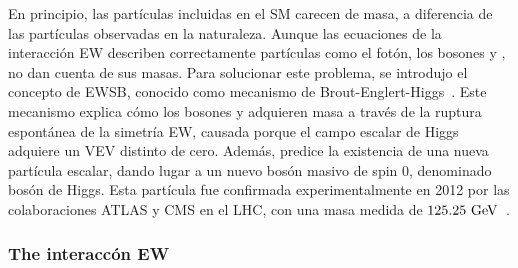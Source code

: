 En principio, las partículas incluidas en el \ac{SM} carecen de masa, a diferencia de las partículas observadas en la naturaleza. Aunque las ecuaciones de la interacci\'on \ac{EW} describen correctamente partículas como el fotón, los bosones \Wboson y \Zboson, no dan cuenta de sus masas. Para solucionar este problema, se introdujo el concepto de \ac{EWSB}, conocido como mecanismo de Brout-Englert-Higgs~\cite{Higgs-1964_1,Higgs-1964_2,Higgs-1966,Englert_Brout-1964}. Este mecanismo explica cómo los bosones \Wboson y \Zboson adquieren masa a través de la ruptura espontánea de la simetría \ac{EW}, causada porque el campo escalar de Higgs adquiere un \ac{VEV} distinto de cero. Además, predice la existencia de una nueva partícula escalar, dando lugar a un nuevo bosón masivo de spin 0, denominado bosón de Higgs. Esta partícula fue confirmada experimentalmente en 2012 por las colaboraciones \ac{ATLAS} y \ac{CMS} en el \ac{LHC}, con una masa medida de \(125.25~\text{GeV}\)~\cite{ATLAS-HiggsObservation,CMS-HiggsObservation}.









\subsubsection{The interacc\'on \acl{EW}}

